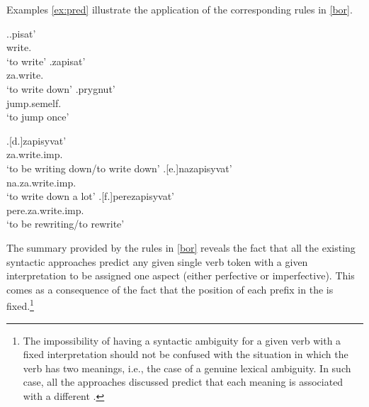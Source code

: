 Examples \ref{ex:pred} illustrate the application of the corresponding rules in \ref{bor}.

\begin{minipage}{0.43\linewidth}
\vspace*{.5\baselineskip}
\ex.\label{ex:pred}\ag.\label{pred1}pisat'\textsuperscript{\IPF}\\
write.\\
`to write'
\bg.\label{pred2}zapisat'\textsuperscript{\PF}\\
za.write.\\
`to write down'
\bg.\label{pred3}prygnut'\textsuperscript{\PF}\\
jump.semelf.\\
`to jump once'

\vspace*{.5\baselineskip}
\end{minipage}%
\begin{minipage}{0.55\linewidth}
\vspace*{.5\baselineskip}
\exg.[d.]\label{pred4}zapisyvat'\textsuperscript{\IPF}\\
za.write.imp.\\
`to be writing down/to write down'
\bg.[e.]\label{pred5}nazapisyvat'\textsuperscript{\PF}\\
na.za.write.imp.\\
`to write down a lot'
\bg.[f.]\label{pred6}perezapisyvat'\textsuperscript{\IPF}\\
pere.za.write.imp.\\
`to be rewriting/to rewrite'

\vspace*{.5\baselineskip}
\end{minipage}

The summary provided by the rules in \ref{bor} reveals the fact that all the existing syntactic approaches predict any given single verb token with a given interpretation to be assigned one aspect (either perfective or imperfective). This comes as a consequence of the fact that the position of each prefix in the  is fixed.\footnote{The impossibility of having a syntactic ambiguity for a given verb with a fixed interpretation should not be confused with the situation in which the verb has two meanings, i.e., the case of a genuine lexical ambiguity. In such case, all the approaches discussed predict that each meaning is associated with a different .} 

